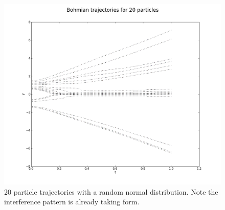 \documentclass[10pt, reqno]{article}
\begin{document}
  \begin{figure}[!ht]
    \centerline{\includegraphics[scale=.3]{./imgs/20-particles-uniform-1.png}}
    \caption{
      20 particle trajectories with a random normal distribution.
      Note the interference pattern is already taking form.
    }
    \label{fig:trajsym}
  \end{figure}

\end{document}
